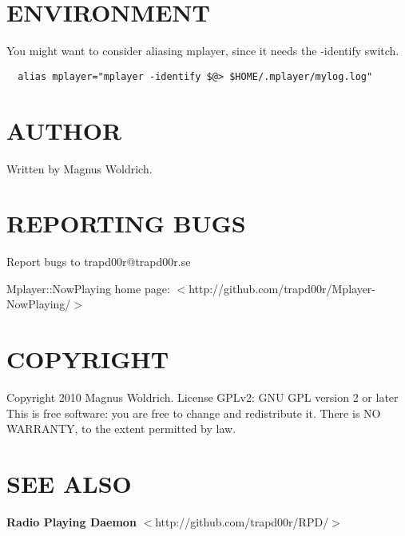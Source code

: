 \section{ENVIRONMENT\label{ENVIRONMENT}}


You might want to consider aliasing mplayer, since it needs the -identify
switch.

\begin{verbatim}
  alias mplayer="mplayer -identify $@> $HOME/.mplayer/mylog.log"
\end{verbatim}
\section{AUTHOR\label{AUTHOR}}


Written by Magnus Woldrich.

\section{REPORTING BUGS\label{REPORTING_BUGS}}


Report bugs to trapd00r@trapd00r.se



Mplayer::NowPlaying home page: $<$http://github.com/trapd00r/Mplayer-NowPlaying/$>$

\section{COPYRIGHT\label{COPYRIGHT}}


Copyright 2010 Magnus Woldrich. License GPLv2: GNU GPL version 2 or later
This is free software: you are free to change and redistribute it.
There is NO WARRANTY, to the extent permitted by law.

\section{SEE ALSO\label{SEE_ALSO}}


\textbf{Radio Playing Daemon} $<$http://github.com/trapd00r/RPD/$>$

